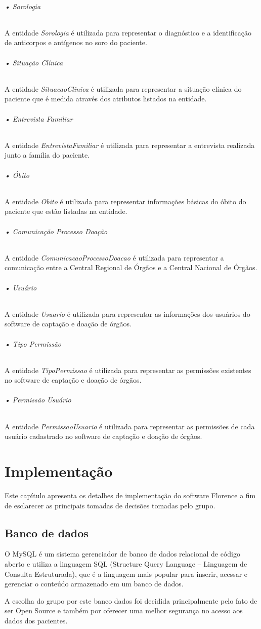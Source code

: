 \documentclass[portuguese,oneside]{tcc}
\begin{document}
\subparagraph{• Sorologia}
A entidade \textit{Sorologia} é utilizada para representar o diagnóstico e a identificação de anticorpos e antígenos no soro do paciente.

\subparagraph{• Situação Clínica}
A entidade \textit{SituacaoClinica} é utilizada para representar a situação clínica do paciente que é medida através dos atributos listados na entidade.

\subparagraph{• Entrevista Familiar}
A entidade \textit{EntrevistaFamiliar} é utilizada para representar a entrevista realizada junto a família do paciente.

\subparagraph{• Óbito}
A entidade \textit{Obito} é utilizada para representar informações básicas do óbito do paciente que estão listadas na entidade.

\subparagraph{• Comunicação Processo Doação}
A entidade \textit{ComunicacaoProcessoDoacao} é utilizada para representar a comunicação entre a Central Regional de Órgãos e a Central Nacional de Órgãos.

\subparagraph{• Usuário}
A entidade \textit{Usuario} é utilizada para representar as informações dos usuários do software de captação e doação de órgãos. 

\subparagraph{• Tipo Permissão}
A entidade \textit{TipoPermissao} é utilizada para representar as permissões existentes no software de captação e doação de órgãos.

\subparagraph{• Permissão Usuário}
A entidade \textit{PermissaoUsuario} é utilizada para representar as permissões de cada usuário cadastrado no software de captação e doação de órgãos.


\chapter{Implementação}
Este capítulo apresenta os detalhes de implementação do software Florence a fim de esclarecer as principais tomadas de decisões tomadas pelo grupo.

\section{Banco de dados}
O MySQL é um sistema gerenciador de banco de dados relacional de código aberto e utiliza a linguagem SQL (Structure Query Language – Linguagem de Consulta Estruturada), que é a linguagem mais popular para inserir, acessar e gerenciar o conteúdo armazenado em um banco de dados.

A escolha do grupo por este banco dados foi decidida principalmente pelo fato de ser Open Source e também por oferecer uma melhor segurança no acesso aos dados dos pacientes. 
\end{document}
